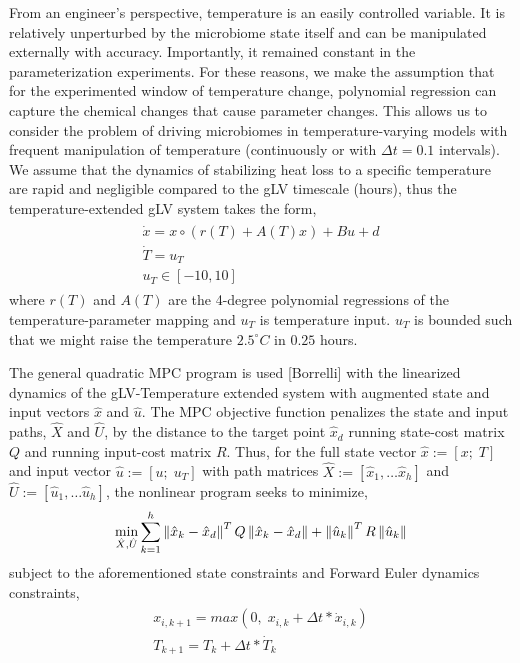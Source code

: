 \documentclass[twocolumn, 10pt]{report}
\begin{document}
{\indent \indent From an engineer's perspective, temperature is an easily controlled variable. It is relatively unperturbed by the microbiome state itself and can be manipulated externally with accuracy. Importantly, it remained constant in the parameterization experiments. For these reasons, we make the assumption that for the experimented window of temperature change, polynomial regression can capture the chemical changes that cause parameter changes. This allows us to consider the problem of driving microbiomes in temperature-varying models with frequent manipulation of temperature (continuously or with $\Delta t=0.1$ intervals). We assume that the dynamics of stabilizing heat loss to a specific temperature are rapid and negligible compared to the gLV timescale (hours), thus the temperature-extended gLV system takes the form,
\begin{align} \label{T_ctrl_dist_gLV}
    \begin{array}{l}
        \dot{x} = x \circ (r(T) + A(T)x) + Bu + d \\
        \dot{T} = u_T \\
        u_T \in [-10, 10]
    \end{array}
\end{align}
where $r(T)$ and $A(T)$ are the 4-degree polynomial regressions of the temperature-parameter mapping and $u_T$ is temperature input. $u_T$ is bounded such that we might raise the temperature $2.5^\circ C$ in $0.25$ hours.

The general quadratic MPC program is used [Borrelli] with the linearized dynamics of the gLV-Temperature extended system with augmented state and input vectors $\hat{x}$ and $\hat{u}$. The MPC objective function penalizes the state and input paths, $\hat{X}$ and $\hat{U}$, by the distance to the target point $\hat{x}_d$ running state-cost matrix $Q$ and running input-cost matrix $R$. Thus, for the full state vector $\hat{x} := [x; \; T]$ and input vector $\hat{u} := [u; \; u_T]$ with path matrices $\hat{X} := [\hat{x}_1, \dots \hat{x}_h]$ and $\hat{U} := [\hat{u}_1, \dots \hat{u}_h]$, the nonlinear program seeks to minimize,
\begin{align} \label{MPC_cost}
    \begin{array}{c}
        \min\limits_{\hat{X},\hat{U}} \mathlarger{\sum}_{k=1}^{h} \left\lVert \hat{x}_k - \hat{x}_d \right\rVert^T Q \left\lVert \hat{x}_k - \hat{x}_d \right\rVert + \left\lVert \hat{u}_k \right\rVert^T R \left\lVert \hat{u}_k \right\rVert 
    \end{array}
\end{align}
subject to the aforementioned state constraints and Forward Euler dynamics constraints,
\begin{align} \label{MPC_dyn_con}
    \begin{array}{c}
        x_{i,k+1} = max(0, \;  x_{i,k} + \Delta t*\dot{x}_{i,k}) \\
        T_{k+1} = T_k + \Delta t*\dot{T}_k
    \end{array}
\end{align}

}
\end{document}
